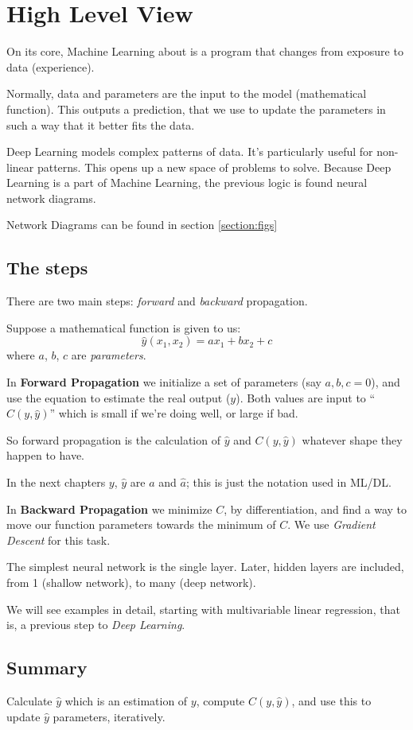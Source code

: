 \section{High Level View}

On its core, Machine Learning about is a program that changes from exposure to data (experience).

Normally, data and parameters are the input to the model (mathematical function). This outputs a prediction, that we use to update the parameters in such a way that it better fits the data.

Deep Learning models complex patterns of data. It's particularly useful for non-linear patterns. This opens up a new space of problems to solve. Because Deep Learning is a part of Machine Learning, the previous logic is found neural network diagrams.

Network Diagrams can be found in section \ref{section:figs} 

\subsection{The steps}
There are two main steps: \textit{forward} and \textit{backward} propagation. 

Suppose a mathematical function is given to us:
$$ \hat{y}(x_1,x_2) = a x_1 + b x_2 + c$$
where $a$, $b$, $c$ are \textit{parameters}.

In \textbf{Forward Propagation} we initialize a set of parameters (say $a,b,c=0$), and use the equation to estimate the real output ($y$). Both values are input to ``$C(y, \hat{y})$'' which is small if we're doing well, or large if bad. 

So forward propagation is the calculation of $\hat{y}$ and $C(y,\hat{y})$ whatever shape they happen to have. 

In the next chapters $y$, $\hat{y}$ are $a$ and $\hat{a}$; this is just the notation used in ML/DL.

In \textbf{Backward Propagation} we minimize $C$, by differentiation, and find a way to move our function parameters towards the minimum of $C$. We use \textit{Gradient Descent} for this task.

The simplest neural network is the single layer. Later, hidden layers are included, from 1 (shallow network), to many (deep network).

We will see examples in detail, starting with multivariable linear regression, that is, a previous step to \textit{Deep Learning}.

\subsection{Summary}
Calculate $\hat{y}$ which is an estimation of $y$, compute $C(y,\hat{y})$, and use this to update $\hat{y}$ parameters, iteratively.


